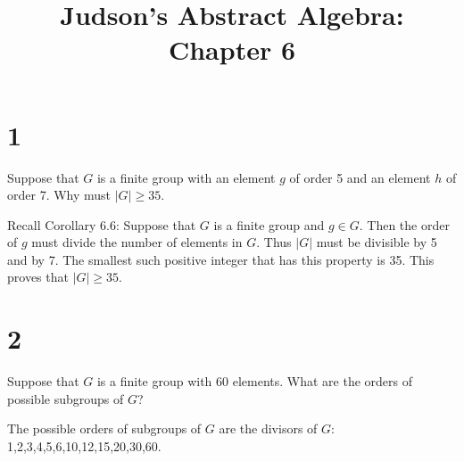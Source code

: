 \documentclass[a4paper]{article}
\title{Judson's Abstract Algebra: Chapter 6}
\date{}
\begin{document}
\maketitle

\section*{1}

Suppose that $G$ is a finite group with an element $g$ of order 5 and an element $h$ of order 7. Why must $|G| \geq 35$.

\vspace{\baselineskip}

Recall Corollary 6.6: Suppose that $G$ is a finite group and $g \in G$. Then the order of $g$ must divide the number of elements in $G$. Thus $|G|$ must be divisible by 5 and by 7. The smallest such positive integer that has this property is 35. This proves that $|G| \geq 35$.


\section*{2}

Suppose that $G$ is a finite group with 60 elements. What are the orders of possible subgroups of $G$?

\vspace{\baselineskip}

The possible orders of subgroups of $G$ are the divisors of $G$: 1,2,3,4,5,6,10,12,15,20,30,60.
\end{document}
